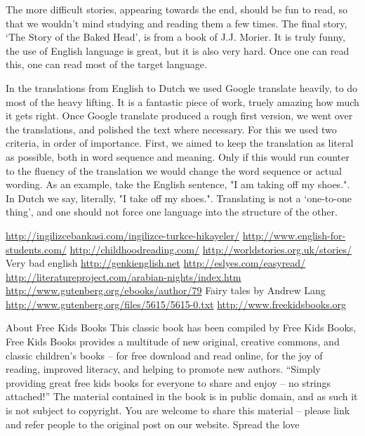 The more difficult stories, appearing towards the end, should be fun to read, so that we wouldn't mind studying and reading them a few times. The final story, `The Story of the Baked Head',  is from a book of J.J. Morier. It is truly funny, the use of  English language is great, but it is also very hard. Once one can read this, one can read most of the target language. 

In the translations from English to Dutch we used Google translate heavily, to do most of the heavy lifting. It is a fantastic piece of work, truely amazing how much it gets right. Once Google translate produced a rough first version, we went over the translations, and polished the text where necessary. For this we used two criteria, in order of importance. First, we aimed to keep the translation as literal as possible,  both in word sequence and meaning. Only if this would run counter to the fluency of the translation we would change the word sequence or actual wording. As an example, take the English sentence, "I am taking off my shoes.". In Dutch we say, literally, "I take off my shoes.". Translating is not a `one-to-one thing', and one should not force one language into the structure of the other.

\url{http://ingilizcebankasi.com/ingilizce-turkce-hikayeler/}
\url{http://www.english-for-students.com/}
\url{http://childhoodreading.com/}
\url{http://worldstories.org.uk/stories/} Very bad english
\url{http://genkienglish.net}
\url{http://eslyes.com/easyread/}
\url{http://literatureproject.com/arabian-nights/index.htm}
\url{http://www.gutenberg.org/ebooks/author/79} Fairy tales by Andrew Lang
\url{http://www.gutenberg.org/files/5615/5615-0.txt}
\url{http://www.freekidsbooks.org}

About Free Kids Books
This classic book has been compiled by Free Kids Books,
Free Kids Books provides a multitude of new original, creative commons, and classic children’s books – for free download and read online, for the joy of reading, improved literacy, and helping to promote new authors.
“Simply providing great free kids books for everyone to share and enjoy – no strings attached!”
The material contained in the book is in public domain, and as such it is not subject to copyright.
You are welcome to share this material – please link and refer people to the original post on our website.
Spread the love
